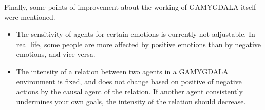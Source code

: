 \hspace{-\parindent}Finally, some points of improvement about the working of GAMYGDALA itself were mentioned.
\begin{itemize}
\item The sensitivity of agents for certain emotions is currently not adjustable. In real life, some people are more affected by positive emotions than by negative emotions, and vice versa.
\item The intensity of a relation between two agents in a GAMYGDALA environment is fixed, and does not change based on positive of negative actions by the causal agent of the relation. If another agent consistently undermines your own goals, the intensity of the relation should decrease.
\end{itemize}